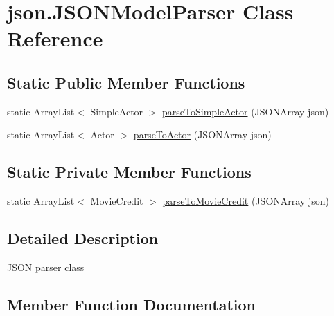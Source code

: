 \hypertarget{classjson_1_1_j_s_o_n_model_parser}{}\section{json.\+J\+S\+O\+N\+Model\+Parser Class Reference}
\label{classjson_1_1_j_s_o_n_model_parser}
\subsection*{Static Public Member Functions}
\begin{DoxyCompactItemize}
\item 
static Array\+List$<$ Simple\+Actor $>$ \hyperlink{classjson_1_1_j_s_o_n_model_parser_aac2531ca949c5c0e9d098b271745a7b3}{parse\+To\+Simple\+Actor} (J\+S\+O\+N\+Array json)
\item 
static Array\+List$<$ Actor $>$ \hyperlink{classjson_1_1_j_s_o_n_model_parser_a68950adf5a65fe4eed3b2849e6a8bc1d}{parse\+To\+Actor} (J\+S\+O\+N\+Array json)
\end{DoxyCompactItemize}
\subsection*{Static Private Member Functions}
\begin{DoxyCompactItemize}
\item 
static Array\+List$<$ Movie\+Credit $>$ \hyperlink{classjson_1_1_j_s_o_n_model_parser_a589014a21bef29a519bbce9f6b92616a}{parse\+To\+Movie\+Credit} (J\+S\+O\+N\+Array json)
\end{DoxyCompactItemize}


\subsection{Detailed Description}
J\+S\+ON parser class 

\subsection{Member Function Documentation}
\mbox{\label{classjson_1_1_j_s_o_n_model_parser_a68950adf5a65fe4eed3b2849e6a8bc1d}} 
